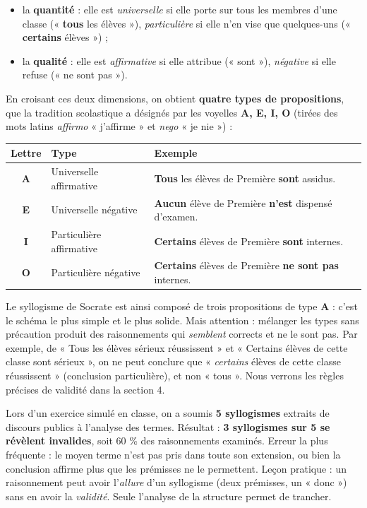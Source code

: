 \documentclass[11pt]{article}
\begin{document}
\begin{itemize}
\item la \textbf{quantité} : elle est \emph{universelle} si elle porte sur tous les membres d'une classe (« \textbf{tous} les élèves »), \emph{particulière} si elle n'en vise que quelques-uns (« \textbf{certains} élèves ») ;
\item la \textbf{qualité} : elle est \emph{affirmative} si elle attribue (« sont »), \emph{négative} si elle refuse (« ne sont pas »).
\end{itemize}

En croisant ces deux dimensions, on obtient \textbf{quatre types de propositions}, que la tradition scolastique a désignés par les voyelles \textbf{A, E, I, O} (tirées des mots latins \emph{affirmo} « j'affirme » et \emph{nego} « je nie ») :

\begin{center}
\begin{tabularx}{\linewidth}{|c|l|X|}
\hline
\rowcolor{popblueL} \textbf{Lettre} & \textbf{Type} & \textbf{Exemple} \\
\hline
\textbf{A} & Universelle affirmative & \textbf{Tous} les élèves de Première \textbf{sont} assidus. \\
\hline
\textbf{E} & Universelle négative & \textbf{Aucun} élève de Première \textbf{n'est} dispensé d'examen. \\
\hline
\textbf{I} & Particulière affirmative & \textbf{Certains} élèves de Première \textbf{sont} internes. \\
\hline
\textbf{O} & Particulière négative & \textbf{Certains} élèves de Première \textbf{ne sont pas} internes. \\
\hline
\end{tabularx}
\end{center}

Le syllogisme de Socrate est ainsi composé de trois propositions de type \textbf{A} : c'est le schéma le plus simple et le plus solide. Mais attention : mélanger les types sans précaution produit des raisonnements qui \emph{semblent} corrects et ne le sont pas. Par exemple, de « Tous les élèves sérieux réussissent » et « Certains élèves de cette classe sont sérieux », on ne peut conclure que « \emph{certains} élèves de cette classe réussissent » (conclusion particulière), et non « tous ». Nous verrons les règles précises de validité dans la section 4.

\begin{exemplebox}
Lors d'un exercice simulé en classe, on a soumis \textbf{5 syllogismes} extraits de discours publics à l'analyse des termes. Résultat : \textbf{3 syllogismes sur 5 se révèlent invalides}, soit 60 \% des raisonnements examinés. Erreur la plus fréquente : le moyen terme n'est pas pris dans toute son extension, ou bien la conclusion affirme plus que les prémisses ne le permettent. Leçon pratique : un raisonnement peut avoir l'\emph{allure} d'un syllogisme (deux prémisses, un « donc ») sans en avoir la \emph{validité}. Seule l'analyse de la structure permet de trancher.
\end{exemplebox}
\end{document}
